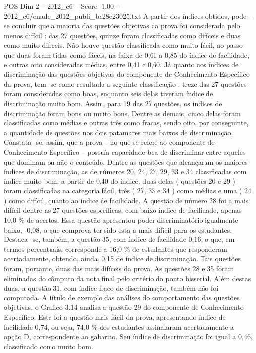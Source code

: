 \begin{textsample}{POS Dim 2 – 2012\_c6 – Score -1.00 – 2012\_c6/enade\_2012\_publi\_bc28e23025.txt}
A partir dos índices obtidos, pode -se concluir que a maioria das questões objetivas da prova foi considerada pelo menos difícil : das 27 questões, quinze foram classificadas como difíceis e duas como muito difíceis.
Não houve questão classificada como muito fácil, ao passo que duas foram tidas como fáceis, na faixa de 0,61 a 0,85 do índice de facilidade, e outras oito consideradas médias, entre 0,41 e 0,60.
Já quanto aos índices de discriminação das questões objetivas do componente de Conhecimento Específico da prova, tem -se como resultado a seguinte classificação : treze das 27 questões foram consideradas como boas, enquanto seis delas tiveram índice de discriminação muito bom.
Assim, para 19 das 27 questões, os índices de discriminação foram bons ou muito bons.
Dentre as demais, cinco delas foram classificadas como médias e outras três como fracas, sendo oito, por conseguinte, a quantidade de questões nos dois patamares mais baixos de discriminação.
Constata -se, assim, que a prova – no que se refere ao componente de Conhecimento Específico – possuía capacidade boa de discriminar entre aqueles que dominam ou não o conteúdo.
Dentre as questões que alcançaram os maiores índices de discriminação, as de números 20, 24, 27, 29, 33 e 34 classificadas com índice muito bom, a partir de 0,40 do índice, duas delas ( questões 20 e 29 ) foram classificadas na categoria fácil, três ( 27, 33 e 34 ) como médias e uma ( 24 ) como difícil, quanto ao índice de facilidade.
A questão de número 28 foi a mais difícil dentre as 27 questões específicas, com baixo índice de facilidade, apenas 10,0 \% de acertos.
Essa questão apresentou poder discriminatório igualmente baixo, -0,08, o que comprova ter sido esta a mais difícil para os estudantes.
Destaca -se, também, a questão 35, com índice de facilidade 0,16, o que, em termos percentuais, corresponde a 16,0 \% de estudantes que responderam acertadamente, obtendo, ainda, 0,15 de índice de discriminação.
Tais questões foram, portanto, duas das mais difíceis da prova.
As questões 28 e 35 foram eliminadas do cômputo da nota final pelo critério do ponto bisserial.
Além destas duas, a questão 31, com índice fraco de discriminação, também não foi computada.
A título de exemplo das análises do comportamento das questões objetivas, o Gráfico 3.14 analisa a questão 29 do componente de Conhecimento Específico.
Esta foi a questão mais fácil da prova, apresentando índice de facilidade 0,74, ou seja, 74,0 \% dos estudantes assinalaram acertadamente a opção D, correspondente ao gabarito.
Seu índice de discriminação foi igual a 0,46, classificado como muito bom.

\end{textsample}
